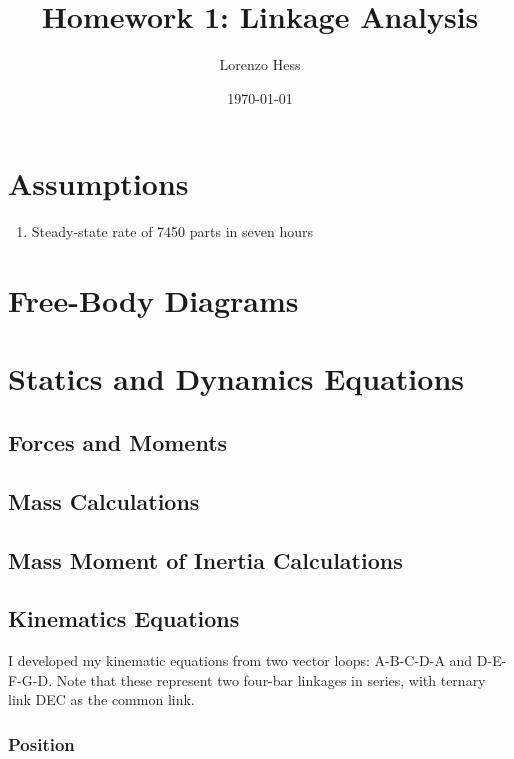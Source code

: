 \documentclass[12pt]{article}
\author{Lorenzo Hess}
\date{\today}
\title{Homework 1: Linkage Analysis}
\let\oldToC\tableofcontents
\renewcommand{\tableofcontents}{\begin{singlespace}\oldToC\end{singlespace}}
\begin{document}
\maketitle
\tableofcontents

\section{Assumptions}%
\label{assum}

\begin{enumerate}
        \item Steady-state rate of 7450 parts in seven hours
\end{enumerate}


\section{Free-Body Diagrams}%
\label{fbds}

\section{Statics and Dynamics Equations}%
\label{eqns}

\subsection{Forces and Moments}%
\label{eqns.forces-moments}

\subsection{Mass Calculations}%
\label{eqns.masses}

\subsection{Mass Moment of Inertia Calculations}%
\label{eqns.mmi}

\subsection{Kinematics Equations}%
\label{eqns.kinematics}

I developed my kinematic equations from two vector loops: A-B-C-D-A and D-E-F-G-D. Note that these represent two four-bar linkages in series, with ternary link DEC as the common link.

\subsubsection{Position}%
\label{eqns.kinematics.position}
\end{document}
